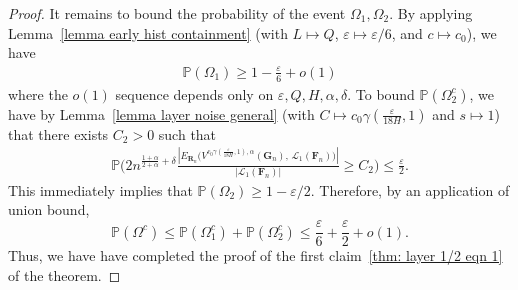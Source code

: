 \documentclass[twoside,11pt]{article}
\theoremstyle{remark}
\begin{document}
\begin{proof}
It remains to bound the probability of the event $\Omega_1, \Omega_2$. By applying Lemma~\ref{lemma early hist containment} (with $L\mapsto Q$, $\varepsilon\mapsto\varepsilon/6$, and $c\mapsto c_0$), we have
\begin{align}
\mathbb{P}(\Omega_1) \geq 1 - \frac{\varepsilon}{6} + o(1) \label{eq:omega1_prob}
\end{align}
where the $o(1)$ sequence depends only on $\varepsilon, Q, H, \alpha, \delta$. To bound $\mathbb{P}\left(\Omega_2^c\right)$, we have by Lemma~\ref{lemma layer noise general} (with $C \mapsto c_0 \gamma(\frac{\varepsilon}{18H}, 1)$ and $s \mapsto 1$) that there exists 
$C_2 > 0$ such that
\begin{align*}
\mathbb{P}\biggl( 2 n^{\frac{1+\alpha}{2+\alpha} + \delta} \frac{\left|E_{\boldsymbol{R}_n}\bigl(V^{c_0\gamma\left(\frac{\varepsilon}{18 H}, 1\right), \alpha}(\boldsymbol{G}_n), \,\mathcal{L}_1\left(\boldsymbol{F}_n\right)\bigr)\right|}{\left| \mathcal{L}_1\left(\boldsymbol{F}_n\right)\right|} \geq C_2\biggr) \leq \frac{\varepsilon}{2}. 
\end{align*}
This immediately implies that $\mathbb{P}(\Omega_2) \geq 1 - \varepsilon/2$. Therefore, by an application of union bound, 
%
\begin{equation*}
\mathbb{P}\left(\Omega^c\right) \leq \mathbb{P}(\Omega_1^c) + \mathbb{P}(\Omega_2^c) \leq \frac{\varepsilon}{6} + \frac{\varepsilon}{2} + o(1). 
\end{equation*}
%
Thus, we have have completed the proof of the first claim~\eqref{thm: layer 1/2 eqn 1} of the theorem.
\vspace{.5in}





\end{proof}
\end{document}
